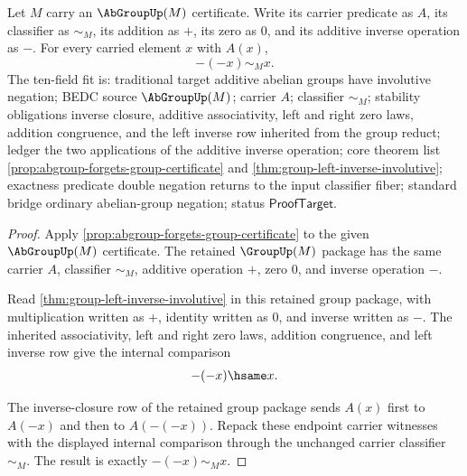 
\begin{theorem}
\label{thm:abgroup-additive-negation-involutive}
Let $M$ carry an $\AbGroupUp(M)$ certificate. Write its carrier predicate as
$A$, its classifier as $\sim_M$, its addition as $+$, its zero as $0$, and its
additive inverse operation as $-$. For every carried element $x$ with $A(x)$,
$$
-(-x)\sim_M x.
$$
The ten-field fit is: traditional target additive abelian groups have
involutive negation; BEDC source $\AbGroupUp(M)$; carrier $A$; classifier
$\sim_M$; stability obligations inverse closure, additive associativity, left
and right zero laws, addition congruence, and the left inverse row inherited
from the group reduct; ledger the two applications of the additive inverse
operation; core theorem list \autoref{prop:abgroup-forgets-group-certificate}
and \autoref{thm:group-left-inverse-involutive}; exactness predicate double
negation returns to the input classifier fiber; standard bridge ordinary
abelian-group negation; status $\mathsf{ProofTarget}$.
\end{theorem}
\begin{proof}
Apply \autoref{prop:abgroup-forgets-group-certificate} to the given
$\AbGroupUp(M)$ certificate. The retained $\GroupUp(M)$ package has the same
carrier $A$, classifier $\sim_M$, additive operation $+$, zero $0$, and inverse
operation $-$.

Read \autoref{thm:group-left-inverse-involutive} in this retained group
package, with multiplication written as $+$, identity written as $0$, and
inverse written as $-$. The inherited associativity, left and right zero laws,
addition congruence, and left inverse row give the internal comparison
$$
-(-x)\hsame x.
$$

The inverse-closure row of the retained group package sends $A(x)$ first to
$A(-x)$ and then to $A(-(-x))$. Repack these endpoint carrier witnesses with
the displayed internal comparison through the unchanged carrier classifier
$\sim_M$. The result is exactly $-(-x)\sim_M x$.
\end{proof}


